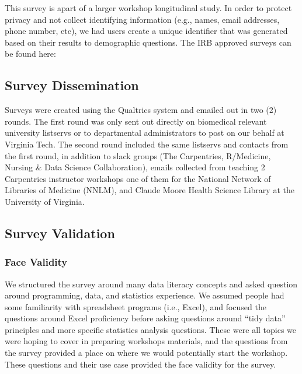 \documentclass[../main.tex]{subfiles}
\begin{document}
        This survey is apart of a larger workshop longitudinal study.
        In order to protect privacy and not collect identifying information (e.g., names, email addresses, phone number, etc),
        we had users create a unique identifier that was generated based on their results to demographic questions.
        The IRB approved surveys can be found here: %

    \subsection{Survey Dissemination}

        Surveys were created using the Qualtrics system and emailed out in two (2) rounds.
        The first round was only sent out directly on biomedical relevant university listservs or to departmental administrators to post on our behalf at Virginia Tech.
        The second round included the same listservs and contacts from the first round,
        in addition to slack groups (The Carpentries, R/Medicine, Nursing \& Data Science Collaboration),
        emails collected from teaching 2 Carpentries instructor workshops one of them for the National Network of Libraries of Medicine (NNLM),
        and
        Claude Moore Health Science Library at the University of Virginia.

    \subsection{Survey Validation}


        \subsubsection{Face Validity}

            We structured the survey around many data literacy concepts and asked question around
            programming, data, and statistics experience.
            We assumed people had some familiarity with spreadsheet programs (i.e., Excel),
            and focused the questions around Excel proficiency before asking questions
            around ``tidy data'' principles and more specific statistics analysis questions.
            These were all topics we were hoping to cover in preparing workshops materials,
            and the questions from the survey provided a place on where we would potentially start the workshop.
            These questions and their use case provided the face validity for the survey.
\end{document}
